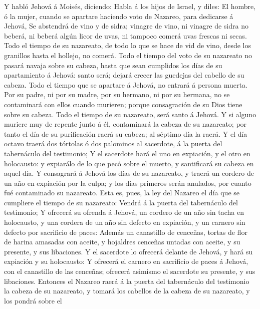  Y habló Jehová á Moisés, diciendo:  Habla á los
hijos de Israel, y diles: El hombre, ó la mujer, cuando se apartare
haciendo voto de Nazareo, para dedicarse á Jehová,  Se
abstendrá de vino y de sidra; vinagre de vino, ni vinagre de sidra no
beberá, ni beberá algún licor de uvas, ni tampoco comerá uvas frescas ni
secas.  Todo el tiempo de su nazareato, de todo lo que se
hace de vid de vino, desde los granillos hasta el hollejo, no comerá.
 Todo el tiempo del voto de su nazareato no pasará navaja
sobre su cabeza, hasta que sean cumplidos los días de su apartamiento á
Jehová: santo será; dejará crecer las guedejas del cabello de su cabeza.
 Todo el tiempo que se apartare á Jehová, no entrará á
persona muerta.  Por su padre, ni por su madre, por su
hermano, ni por su hermana, no se contaminará con ellos cuando murieren;
porque consagración de su Dios tiene sobre su cabeza.  Todo
el tiempo de su nazareato, será santo á Jehová.  Y si alguno
muriere muy de repente junto á él, contaminará la cabeza de su
nazareato; por tanto el día de su purificación raerá su cabeza; al
séptimo día la raerá.  Y el día octavo traerá dos tórtolas
ó dos palominos al sacerdote, á la puerta del tabernáculo del
testimonio;  Y el sacerdote hará el uno en expiación, y el
otro en holocausto: y expiarálo de lo que pecó sobre el muerto, y
santificará su cabeza en aquel día.  Y consagrará á Jehová
los días de su nazareato, y traerá un cordero de un año en expiación por
la culpa; y los días primeros serán anulados, por cuanto fué contaminado
su nazareato.  Esta es, pues, la ley del Nazareo el día que
se cumpliere el tiempo de su nazareato: Vendrá á la puerta del
tabernáculo del testimonio;  Y ofrecerá su ofrenda á
Jehová, un cordero de un año sin tacha en holocausto, y una cordera de
un año sin defecto en expiación, y un carnero sin defecto por sacrificio
de paces:  Además un canastillo de cenceñas, tortas de flor
de harina amasadas con aceite, y hojaldres cenceñas untadas con aceite,
y su presente, y sus libaciones.  Y el sacerdote lo
ofrecerá delante de Jehová, y hará su expiación y su holocausto:
 Y ofrecerá el carnero en sacrificio de paces á Jehová, con
el canastillo de las cenceñas; ofrecerá asimismo el sacerdote su
presente, y sus libaciones.  Entonces el Nazareo raerá á la
puerta del tabernáculo del testimonio la cabeza de su nazareato, y
tomará los cabellos de la cabeza de su nazareato, y los pondrá sobre el
